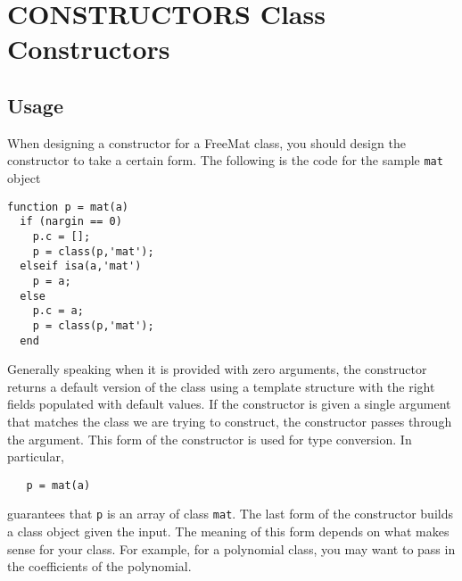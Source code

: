 \section{CONSTRUCTORS Class Constructors}

\subsection{Usage}

When designing a constructor for a FreeMat class, you should
design the constructor to take a certain form.  The following
is the code for the sample \verb|mat| object 
\begin{verbatim}
function p = mat(a)
  if (nargin == 0)
    p.c = [];
    p = class(p,'mat');
  elseif isa(a,'mat')
    p = a;
  else
    p.c = a;
    p = class(p,'mat');
  end
\end{verbatim}
Generally speaking when it is provided with zero arguments, the
constructor returns a default version of the class using a template
structure with the right fields populated with default values.  If
the constructor is given a single argument that matches the class
we are trying to construct, the constructor passes through the
argument.  This form of the constructor is used for type conversion.
In particular, 
\begin{verbatim}
   p = mat(a)
\end{verbatim}
guarantees that \verb|p| is an array of class \verb|mat|.  The last form
of the constructor builds a class object given the input.  The
meaning of this form depends on what makes sense for your class.
For example, for a polynomial class, you may want to pass in the
coefficients of the polynomial.
